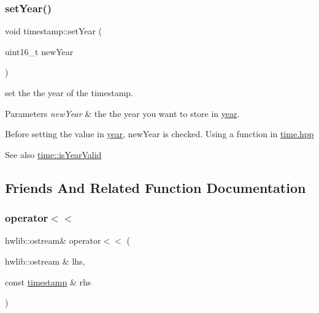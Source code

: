 \subsubsection{\texorpdfstring{set\+Year()}{setYear()}}
{\footnotesize\ttfamily void timestamp\+::set\+Year (\begin{DoxyParamCaption}\item[{uint16\+\_\+t}]{new\+Year }\end{DoxyParamCaption})}



set the the year of the timestamp. 


\begin{DoxyParams}{Parameters}
{\em new\+Year} & the the year you want to store in \mbox{\hyperlink{classtimestamp_a6df342bdd1101cf67f9a4831d5372d58}{year}}.\\
\hline
\end{DoxyParams}
Before setting the value in \mbox{\hyperlink{classtimestamp_a6df342bdd1101cf67f9a4831d5372d58}{year}}, new\+Year is checked. Using a function in \mbox{\hyperlink{time_8hpp_source}{time.\+hpp}} \begin{DoxySeeAlso}{See also}
\mbox{\hyperlink{classtime_ad6269d0f650cfc32e0ac83b09816abad}{time\+::is\+Year\+Valid}} 
\end{DoxySeeAlso}


\subsection{Friends And Related Function Documentation}
\mbox{\label{classtimestamp_a0625abe0748dbab228b73920dfc33c4c}} 
\subsubsection{\texorpdfstring{operator$<$$<$}{operator<<}}
{\footnotesize\ttfamily hwlib\+::ostream\& operator$<$$<$ (\begin{DoxyParamCaption}\item[{hwlib\+::ostream \&}]{lhs,  }\item[{const \mbox{\hyperlink{classtimestamp}{timestamp}} \&}]{rhs }\end{DoxyParamCaption})\hspace{0.3cm}{\ttfamily [friend]}}



